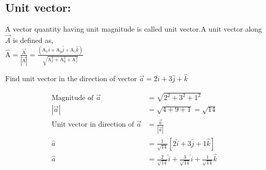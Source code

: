 \subsection{Unit vector:} 
\begin{definition}
	A vector quantity having unit magnitude is called unit vector.A unit vector along $\vec{A}$ is defined as,
	\\$\hat{\mathrm A}=\frac{\vec{\mathrm A}} {|\vec{\mathrm A}|}=\frac {\left(\mathrm A_{x} \hat{i}+\mathrm A_{y} \hat{j}+\mathrm A_{z} \hat{k}\right) } {\sqrt{\mathrm A_{x}^{2}+\mathrm A_{y}^{2}+\mathrm A_{z}^{2}}}$
\end{definition}
 \begin{exercise}
 	Find unit vector in the direction of vector $\vec{a}=2 \hat{i}+3 \hat{j}+\hat{k}$
 	 \end{exercise}
  \begin{answer}
  	
  	\begin{align*}
  		\text{Magnitude of }\vec{ a}&=\sqrt{2^{2}+3^{2}+1^{2}}\\
  		|\vec{a}|&=\sqrt{4+9+1}=\sqrt{14}\\
  		\text{Unit vector in direction of }\vec{a}&=\frac{\vec{a}}{| \vec{a}|}\\
  		\hat{a}&=\frac{1}{\sqrt{14}}[2 \hat{i}+3 \hat{j}+1 \hat{k}] \\
  		\hat{a}&=\frac{2}{\sqrt{14}} \hat{i}+\frac{3}{\sqrt{14}} \hat{i}+\frac{1}{\sqrt{14}} \hat{k}
  	\end{align*}
  	
  \end{answer}
